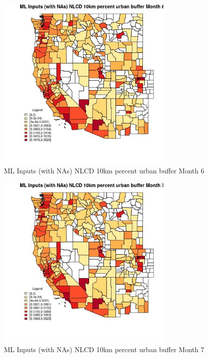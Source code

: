 \begin{figure} 
\centering  
\includegraphics[width=0.77\textwidth]{Code_Outputs/Report_ML_input_PM25_Step4_part_f_de_duplicated_aves_prioritize_24hr_obswNAs_CountyNLCD_10km_percent_urban_buffermedianMonth6.jpg} 
\caption{\label{fig:Report_ML_input_PM25_Step4_part_f_de_duplicated_aves_prioritize_24hr_obswNAsCountyNLCD_10km_percent_urban_buffermedianMonth6}ML Inputs (with NAs) NLCD 10km percent urban buffer Month 6} 
\end{figure} 
 

\clearpage 

\begin{figure} 
\centering  
\includegraphics[width=0.77\textwidth]{Code_Outputs/Report_ML_input_PM25_Step4_part_f_de_duplicated_aves_prioritize_24hr_obswNAs_CountyNLCD_10km_percent_urban_buffermedianMonth7.jpg} 
\caption{\label{fig:Report_ML_input_PM25_Step4_part_f_de_duplicated_aves_prioritize_24hr_obswNAsCountyNLCD_10km_percent_urban_buffermedianMonth7}ML Inputs (with NAs) NLCD 10km percent urban buffer Month 7} 
\end{figure} 
 

